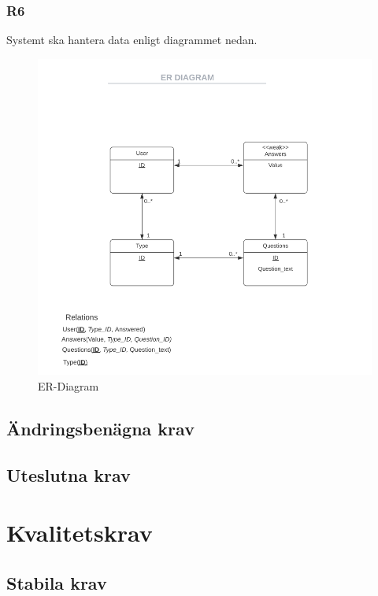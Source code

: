 \documentclass{article}
\begin{document}
    \newpage
    \subsubsection*{R6}
    Systemt ska hantera data enligt diagrammet nedan.
       \begin{figure}[h!]
    
    \includegraphics[width=150mm]{ERDIAGRAM.png}
    \caption{ER-Diagram}
    \end{figure}
    
    \newpage
    \subsection*{Ändringsbenägna krav}
    \subsection*{Uteslutna krav}
    
  
   
    \section{Kvalitetskrav}
    \subsection*{Stabila krav}
  
\end{document}
